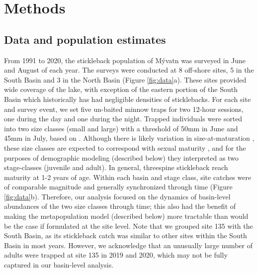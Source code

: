 \documentclass[11pt]{article}
\begin{document}

\section*{Methods} 



\subsection*{Data and population estimates} 

From 1991 to 2020, 
the stickleback population of M\'{y}vatn was surveyed in June and August of each year. 
The surveys were conducted at 8 off-shore sites, 
5 in the South Basin and 3 in the North Basin
(Figure \ref{fig:data}a).
These sites provided wide coverage of the lake,
with exception of the eastern portion of the South Basin 
which historically has had negligible densities of sticklebacks.
For each site and survey event, 
we set five un-baited minnow traps for two 12-hour sessions, 
one during the day and one during the night. 
Trapped individuals were sorted into two size classes (small and large)
with a threshold of 50mm in June and 45mm in July, based on \citep{gislason1998}. 
Although there is likely variation in size-at-maturation \citep{singkam2019},
these size classes are expected to correspond with sexual maturity \citep{gislason1998},
and for the purposes of demographic modeling (described below) 
they interpreted as two stage-classes (juvenile and adult).
In general, threespine stickleback reach maturity at 1-2 years of age.
Within each basin and stage class, 
site catches were of comparable magnitude and 
generally synchronized through time (Figure \ref{fig:data}b).
Therefore, our analysis focused on the dynamics of basin-level abundances
of the two size classes through time;
this also had the benefit of making the metapopulation model (described below) more tractable
than would be the case if formulated at the site level.
Note that we grouped site 135 with the South Basin, 
as its stickleback catch was similar to other sites within the South Basin in most years.
However, 
we acknowledge that an unusually large number of adults were trapped at site 135
in 2019 and 2020, which may not be fully captured in our basin-level analysis.
\end{document}
